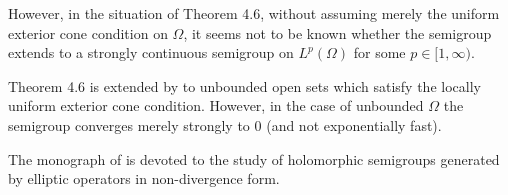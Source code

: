 However, in the situation of Theorem 4.6, without assuming merely the uniform exterior cone condition on $\Omega$, it seems not to be known whether the semigroup extends to a strongly continuous semigroup on $L^p(\Omega)$ for some $p \in [1,\infty)$.

Theorem 4.6 is extended by \citet{AS25} to unbounded open sets which satisfy the locally uniform exterior cone condition. However, in the case of unbounded $\Omega$ the semigroup converges merely strongly to $0$ (and not exponentially fast).

The monograph of \citet{Lu95} is devoted to the study of holomorphic semigroups generated by elliptic operators in non-divergence form.